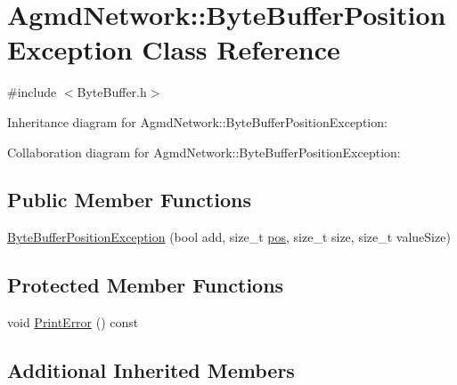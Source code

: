 \hypertarget{class_agmd_network_1_1_byte_buffer_position_exception}{\section{Agmd\+Network\+:\+:Byte\+Buffer\+Position\+Exception Class Reference}
\label{class_agmd_network_1_1_byte_buffer_position_exception}
}


{\ttfamily \#include $<$Byte\+Buffer.\+h$>$}



Inheritance diagram for Agmd\+Network\+:\+:Byte\+Buffer\+Position\+Exception\+:


Collaboration diagram for Agmd\+Network\+:\+:Byte\+Buffer\+Position\+Exception\+:
\subsection*{Public Member Functions}
\begin{DoxyCompactItemize}
\item 
\hyperlink{class_agmd_network_1_1_byte_buffer_position_exception_ad9303c981d0147b003618ef8ae44d601}{Byte\+Buffer\+Position\+Exception} (bool add, size\+\_\+t \hyperlink{_examples_2_planet_2_app_8cpp_aa8a1c0491559faca4ebd0881575ae7f0}{pos}, size\+\_\+t size, size\+\_\+t value\+Size)
\end{DoxyCompactItemize}
\subsection*{Protected Member Functions}
\begin{DoxyCompactItemize}
\item 
void \hyperlink{class_agmd_network_1_1_byte_buffer_position_exception_a73ef2493df027f2a6b7786efbe6fa9de}{Print\+Error} () const 
\end{DoxyCompactItemize}
\subsection*{Additional Inherited Members}


